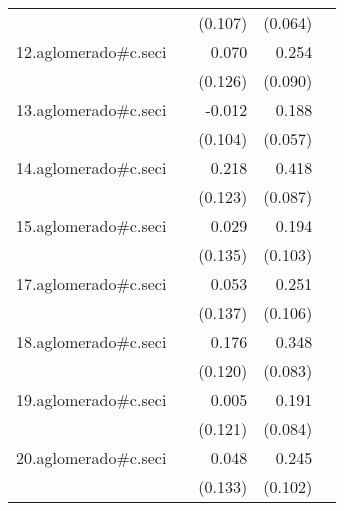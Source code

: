 {\begin{longtable}{l*{4}{D{.}{.}{-1}}}
            &                     &     (0.107)         &     (0.064)         &                     \\
\addlinespace
12.aglomerado#c.seci&                     &       0.070         &       0.254\sym{**} &                     \\
            &                     &     (0.126)         &     (0.090)         &                     \\
\addlinespace
13.aglomerado#c.seci&                     &      -0.012         &       0.188\sym{**} &                     \\
            &                     &     (0.104)         &     (0.057)         &                     \\
\addlinespace
14.aglomerado#c.seci&                     &       0.218         &       0.418\sym{***}&                     \\
            &                     &     (0.123)         &     (0.087)         &                     \\
\addlinespace
15.aglomerado#c.seci&                     &       0.029         &       0.194         &                     \\
            &                     &     (0.135)         &     (0.103)         &                     \\
\addlinespace
17.aglomerado#c.seci&                     &       0.053         &       0.251\sym{*}  &                     \\
            &                     &     (0.137)         &     (0.106)         &                     \\
\addlinespace
18.aglomerado#c.seci&                     &       0.176         &       0.348\sym{***}&                     \\
            &                     &     (0.120)         &     (0.083)         &                     \\
\addlinespace
19.aglomerado#c.seci&                     &       0.005         &       0.191\sym{*}  &                     \\
            &                     &     (0.121)         &     (0.084)         &                     \\
\addlinespace
20.aglomerado#c.seci&                     &       0.048         &       0.245\sym{*}  &                     \\
            &                     &     (0.133)         &     (0.102)         &                     \\

\end{longtable}}

